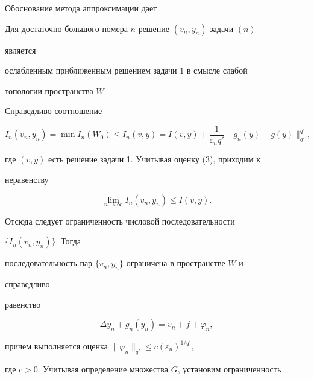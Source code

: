  


Обоснование метода аппроксимации дает


 


\begin{thm} 


Для достаточно большого номера $n$ решение $(v_n,y_n)$ задачи $(n)$ 


является 


ослабленным приближенным решением задачи $1$ в смысле слабой 


топологии пространства $W$. 


\end{thm} 


 


\begin{pf} 


Справедливо соотношение 


$$ 


I_n(v_n,y_n)=\min I_n(W_0)\le I_n(v,y)=I(v,y)+ 


\frac{1}{\varepsilon_n q'}\|g_n(y)-g(y)\|^{q'}_{q'}, 


$$ 


где $(v,y)$ есть решение задачи 1. Учитывая оценку (3), приходим к 


неравенству 


\begin{equation} 


\lim_{n\to\infty}I_n(v_n,y_n)\le I(v,y). 


\end{equation} 


Отсюда следует ограниченность числовой последовательности 


$\{I_n(v_n,y_n)\}$. Тогда 


последовательность пар $\{v_n,y_n\}$ ограничена в пространстве $W$ и 


справедливо 


равенство 


\begin{equation} 


\Delta y_n+g_n(y_n)=v_n+f+\varphi_n, 


\end{equation} 


причем выполняется оценка $\|\varphi_n\|_{q'}\le 


c(\varepsilon_n)^{1/q'}$, 


где $c>0$. Учитывая определение множества $G$, установим ограниченность 



\end{pf}
